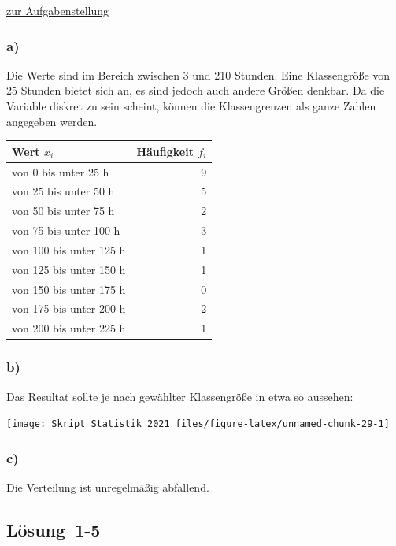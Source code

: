 \documentclass[
  11pt,
  ngerman,
  a4paper,
]{report}
\begin{document}
\protect\hyperlink{aufgabe-1-4}{zur Aufgabenstellung}

\hypertarget{a-1}{%
\subsubsection{a)}\label{a-1}}

Die Werte sind im Bereich zwischen 3 und 210 Stunden. Eine Klassengröße von 25 Stunden bietet sich an, es sind jedoch auch andere Größen denkbar. Da die Variable diskret zu sein scheint, können die Klassengrenzen als ganze Zahlen angegeben werden.

\begin{table}[H]
\centering
\begin{tabular}{lr}
\toprule
Wert $x_i$ & Häufigkeit $f_i$\\
\midrule
von 0 bis unter 25 h & 9\\
von 25 bis unter 50 h & 5\\
von 50 bis unter 75 h & 2\\
von 75 bis unter 100 h & 3\\
von 100 bis unter 125 h & 1\\
von 125 bis unter 150 h & 1\\
von 150 bis unter 175 h & 0\\
von 175 bis unter 200 h & 2\\
von 200 bis unter 225 h & 1\\
\bottomrule
\end{tabular}
\end{table}

\hypertarget{b-1}{%
\subsubsection{b)}\label{b-1}}

Das Resultat sollte je nach gewählter Klassengröße in etwa so aussehen:

\begin{center}\texttt{[image: Skript\_Statistik\_2021\_files/figure-latex/unnamed-chunk-29-1]} \end{center}

\hypertarget{c-1}{%
\subsubsection{c)}\label{c-1}}

Die Verteilung ist unregelmäßig abfallend.

\hypertarget{loesung-1-5}{%
\subsection{Lösung~1-5}\label{loesung-1-5}}
\end{document}
